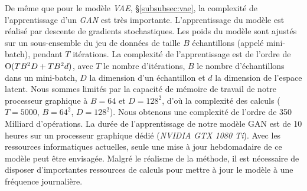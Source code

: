 De même que pour le modèle \textit{VAE}, §\ref{subsubsec:vae}, la complexité de l'apprentissage d'un \textit{GAN} est très importante.
L'apprentissage du modèle est réalisé par descente de gradients stochastiques.
Les poids du modèle sont ajustés sur un sous-ensemble du jeu de données de taille $B$ échantillons (appelé mini-batch), pendant $T$ itérations.
La complexité de l'apprentissage est de l'ordre de $\operatorname{O}(T B^2 D + T B^2 d)$, avec $T$ le nombre d'itérations, $B$ le nombre d'échantillons dans un mini-batch, $D$ la dimension d'un échantillon et $d$ la dimension de l'espace latent.
Nous sommes limités par la capacité de mémoire de travail de notre processeur graphique à $B=64$ et $D=128^2$, d'où la complexité des calculs ($T=5000$, $B=64^2$, $D=128^2$). Nous obtenons une complexité de l'ordre de 350 Milliard d'opérations.
La durée de l'apprentissage de notre modèle GAN est de 10 heures sur un processeur graphique dédié (\textit{NVIDIA GTX 1080 Ti}).
Avec les ressources informatiques actuelles, seule une mise à jour hebdomadaire de ce modèle peut être envisagée.
Malgré le réalisme de la méthode, il est nécessaire de disposer d'importantes ressources de calculs pour mettre à jour le modèle à une fréquence journalière.





%


